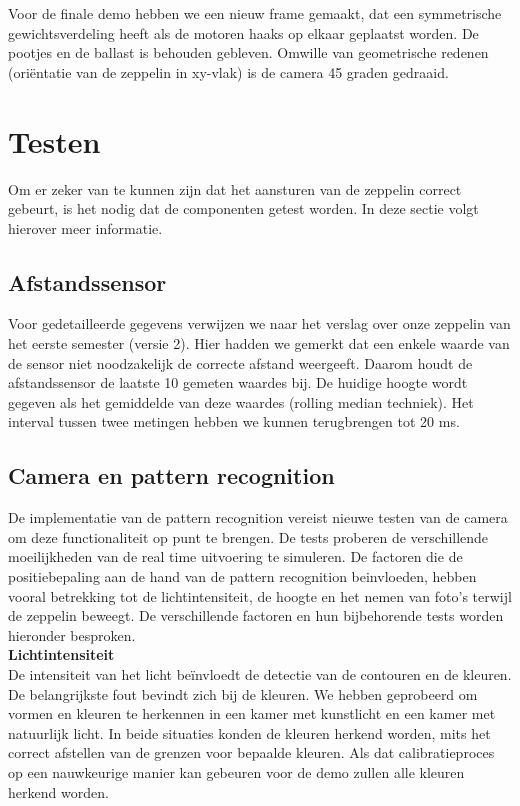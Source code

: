 \documentclass[eind]{penoverslag}
\begin{document}
Voor de finale demo hebben we een nieuw frame gemaakt, dat een symmetrische gewichtsverdeling heeft als de motoren haaks op elkaar geplaatst worden. De pootjes en de ballast is behouden gebleven. Omwille van geometrische redenen (ori\"entatie van de zeppelin in xy-vlak) is de camera 45 graden gedraaid. \\

\section{Testen}

Om er zeker van te kunnen zijn dat het aansturen van de zeppelin correct gebeurt, is het nodig dat de componenten getest worden. In deze sectie volgt hierover meer informatie.

\subsection{Afstandssensor}
Voor gedetailleerde gegevens verwijzen we naar het verslag over onze zeppelin van het eerste semester (versie 2). Hier hadden we gemerkt dat een enkele waarde van de sensor niet noodzakelijk de correcte afstand weergeeft. Daarom houdt de afstandssensor de laatste 10 gemeten waardes bij. De huidige hoogte wordt gegeven als het gemiddelde van deze waardes (rolling median techniek). Het interval tussen twee metingen hebben we kunnen terugbrengen tot 20 ms.

\subsection{Camera en pattern recognition}
De implementatie van de pattern recognition vereist nieuwe testen van de camera om deze functionaliteit op punt te brengen. De tests proberen de verschillende moeilijkheden van de real time uitvoering te simuleren. De factoren die de positiebepaling aan de hand van de pattern recognition beinvloeden, hebben vooral betrekking tot de lichtintensiteit, de hoogte en het nemen van foto’s terwijl de zeppelin beweegt. De verschillende factoren en hun bijbehorende tests worden hieronder besproken.
\\

\textbf{Lichtintensiteit}\\
De intensiteit van het licht be\"{i}nvloedt de detectie van de contouren en de kleuren. De belangrijkste fout bevindt zich bij de kleuren. We hebben geprobeerd om vormen en kleuren te herkennen in een kamer met kunstlicht en een kamer met natuurlijk licht. In beide situaties konden de kleuren herkend worden, mits het correct afstellen van de grenzen voor bepaalde kleuren. Als dat calibratieproces op een nauwkeurige manier kan gebeuren voor de demo zullen alle kleuren herkend worden.\\
\end{document}
